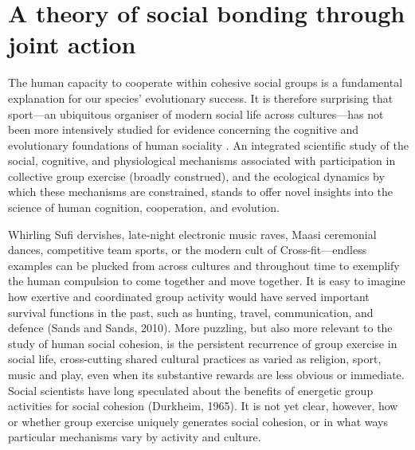 \chapter{\label{theoryContribution}A theory of social bonding through joint action}




The human capacity to cooperate within cohesive social groups is a fundamental explanation for our species' evolutionary success.  It is therefore surprising that sport---an ubiquitous organiser of modern social life across cultures---has not been more intensively studied for evidence concerning the cognitive and evolutionary foundations of human sociality \citep{Blanchard1995,Downey2005a}.  An integrated scientific study of the social, cognitive, and physiological mechanisms associated with participation in collective group exercise (broadly construed), and the ecological dynamics by which these mechanisms are constrained, stands to offer novel insights into the science of human cognition, cooperation, and evolution.

Whirling Sufi dervishes, late-night electronic music raves, Maasi ceremonial dances, competitive team sports, or the modern cult of Cross-fit---endless examples can be plucked from across cultures and throughout time to exemplify the human compulsion to come together and move together.  It is easy to imagine how exertive and coordinated group activity would have served important survival functions in the past, such as hunting, travel, communication, and defence (Sands and Sands, 2010).  More puzzling, but also more relevant to the study of human social cohesion, is the persistent recurrence of group exercise in social life, cross-cutting shared cultural practices as varied as religion, sport, music and play, even when its substantive rewards are less obvious or immediate.  Social scientists have long speculated about the benefits of energetic group activities for social cohesion (Durkheim, 1965). It is not yet clear, however, how or whether group exercise uniquely generates social cohesion, or in what ways particular mechanisms vary by activity and culture.

